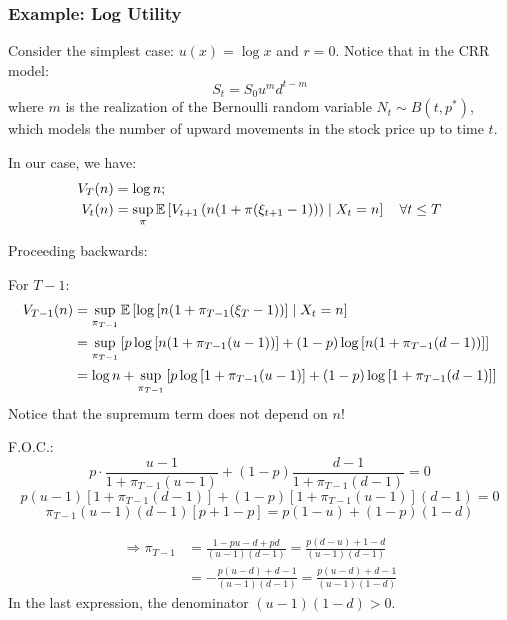 \subsubsection{Example: Log Utility}

Consider the simplest case: $u(x) = \log x$ and $r = 0$.
Notice that in the CRR model:
\begin{equation}
    S_t = S_0 u^m d^{t-m}
\end{equation}
where $m$ is the realization of the Bernoulli random variable $N_t \sim B(t, p^*)$, which models the number of upward movements in the stock price up to time $t$.

In our case, we have:
\begin{align*}
    V_T(n) &= \log n; \\
    V_t(n) &= \sup_{\pi} \mathbb E \left[ V_{t+1} \left( n(1 + \pi (\xi_{t+1} - 1)) \right) \mid X_t = n \right] \quad \forall t \leq T
\end{align*}

Proceeding backwards:

For $T-1$:
\begin{align*}
    V_{T-1}(n) &= \sup_{\pi_{T-1}} \mathbb E \left[ \log \left[ n(1 + \pi_{T-1}(\xi_T - 1)) \right] \mid X_t = n \right] \\
    &= \sup_{\pi_{T-1}} \left[ p \log \left[ n(1 + \pi_{T-1}(u - 1)) \right] + (1-p) \log \left[ n(1 + \pi_{T-1}(d - 1)) \right] \right] \\
    &= \log n + \sup_{\pi_{T-1}} \left[ p \log \left[ 1 + \pi_{T-1}(u - 1) \right] + (1-p) \log \left[ 1 + \pi_{T-1}(d - 1) \right] \right]
\end{align*}
Notice that the supremum term does not depend on $n$!

F.O.C.:
\begin{equation*}
    p \cdot \frac{u - 1}{1 + \pi_{T-1}(u - 1)} + (1-p) \frac{d - 1}{1 + \pi_{T-1}(d - 1)} = 0
\end{equation*}
\begin{equation*}
    p(u - 1) [1 + \pi_{T-1}(d - 1)] + (1-p) [1 + \pi_{T-1}(u - 1)](d - 1) = 0
\end{equation*}
\begin{equation*}
    \pi_{T-1}(u - 1)(d - 1) [p + 1 - p] = p(1 - u) + (1-p)(1 - d)
\end{equation*}

\begin{align*}
    \Rightarrow \pi_{T-1} &= \frac{1 - pu - d + pd}{(u - 1)(d - 1)} = \frac{p(d - u) + 1 - d}{(u - 1)(d - 1)} \\
    &= - \frac{p(u - d) + d - 1}{(u - 1)(d - 1)} = \frac{p(u - d) + d - 1}{(u - 1)(1 - d)}
\end{align*}
In the last expression, the denominator $(u-1)(1-d) > 0$.

